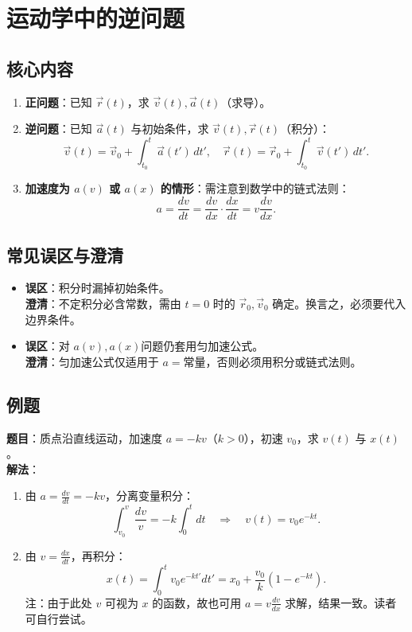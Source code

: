 \newpage

\section{运动学中的逆问题}
\subsection{核心内容}
\begin{enumerate}
    \item \textbf{正问题}：已知 $\vec{r}(t)$，求 $\vec{v}(t), \vec{a}(t)$（求导）。
    \item \textbf{逆问题}：已知 $\vec{a}(t)$ 与初始条件，求 $\vec{v}(t), \vec{r}(t)$（积分）：
          \[
              \vec{v}(t) = \vec{v}_0 + \int_{t_0}^{t} \vec{a}(t')\,dt',\quad
              \vec{r}(t) = \vec{r}_0 + \int_{t_0}^{t} \vec{v}(t')\,dt'.
          \]
    \item \textbf{加速度为 $a(v)$ 或 $a(x)$ 的情形}：需注意到数学中的链式法则：
          \[
              a = \frac{dv}{dt} = \frac{dv}{dx}\cdot\frac{dx}{dt} = v\frac{dv}{dx}.
          \]
\end{enumerate}

\subsection{常见误区与澄清}
\begin{itemize}
    \item \textbf{误区}：积分时漏掉初始条件。\\
          \textbf{澄清}：不定积分必含常数，需由 $t=0$ 时的 $\vec{r}_0, \vec{v}_0$ 确定。换言之，必须要代入边界条件。
    \item \textbf{误区}：对 $a(v), a(x)$问题仍套用匀加速公式。\\
          \textbf{澄清}：匀加速公式仅适用于 $a = \text{常量}$，否则必须用积分或链式法则。
\end{itemize}

\subsection{例题}
\textbf{题目}：质点沿直线运动，加速度 $a = -kv$（$k>0$），初速 $v_0$，求 $v(t)$ 与 $x(t)$。\\
\textbf{解法}：
\begin{enumerate}
    \item 由 $a = \frac{dv}{dt} = -kv$，分离变量积分：
          \[
              \int_{v_0}^{v} \frac{dv}{v} = -k\int_0^t dt \quad\Rightarrow\quad v(t) = v_0 e^{-kt}.
          \]
    \item 由 $v = \frac{dx}{dt}$，再积分：
          \[
              x(t) = \int_0^t v_0 e^{-kt'} dt' = x_0 + \frac{v_0}{k}(1 - e^{-kt}).
          \]
          注：由于此处 $v$ 可视为 $x$ 的函数，故也可用 $a = v\frac{dv}{dx}$ 求解，结果一致。读者可自行尝试。
\end{enumerate}

